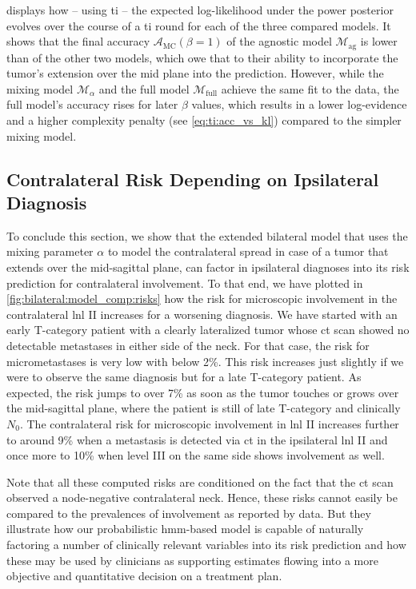 \documentclass[\relativeRoot/main.tex]{subfiles}
\begin{document}
 displays how -- using \gls{ti} -- the expected log-likelihood under the power posterior evolves over the course of a \gls{ti} round for each of the three compared models. It shows that the final accuracy $\mathcal{A}_\text{MC}(\beta=1)$ of the agnostic model $\mathcal{M}_\text{ag}$ is lower than of the other two models, which owe that to their ability to incorporate the tumor's extension over the mid plane into the prediction. However, while the mixing model $\mathcal{M}_\alpha$ and the full model $\mathcal{M}_\text{full}$ achieve the same fit to the data, the full model's accuracy rises for later $\beta$ values, which results in a lower log-evidence and a higher complexity penalty (see \cref{eq:ti:acc_vs_kl}) compared to the simpler mixing model.

\subsection{Contralateral Risk Depending on Ipsilateral Diagnosis}
\label{subsec:bilateral:model_comp:risk}

To conclude this section, we show that the extended bilateral model that uses the mixing parameter $\alpha$ to model the contralateral spread in case of a tumor that extends over the mid-sagittal plane, can factor in ipsilateral diagnoses into its risk prediction for contralateral involvement. To that end, we have plotted in \cref{fig:bilateral:model_comp:risks} how the risk for microscopic involvement in the contralateral \gls{lnl} II increases for a worsening diagnosis. We have started with an early T-category patient with a clearly lateralized tumor whose \gls{ct} scan showed no detectable metastases in either side of the neck. For that case, the risk for micrometastases is very low with below 2\%. This risk increases just slightly if we were to observe the same diagnosis but for a late T-category patient. As expected, the risk jumps to over 7\% as soon as the tumor touches or grows over the mid-sagittal plane, where the patient is still of late T-category and clinically $N_0$. The contralateral risk for microscopic involvement in \gls{lnl} II increases further to around 9\% when a metastasis is detected via \gls{ct} in the ipsilateral \gls{lnl} II and once more to 10\% when level III on the same side shows involvement as well.

Note that all these computed risks are conditioned on the fact that the \gls{ct} scan observed a node-negative contralateral neck. Hence, these risks cannot easily be compared to the prevalences of involvement as reported by data. But they illustrate how our probabilistic \acrshort{hmm}-based model is capable of naturally factoring a number of clinically relevant variables into its risk prediction and how these may be used by clinicians as supporting estimates flowing into a more objective and quantitative decision on a treatment plan.
\end{document}
